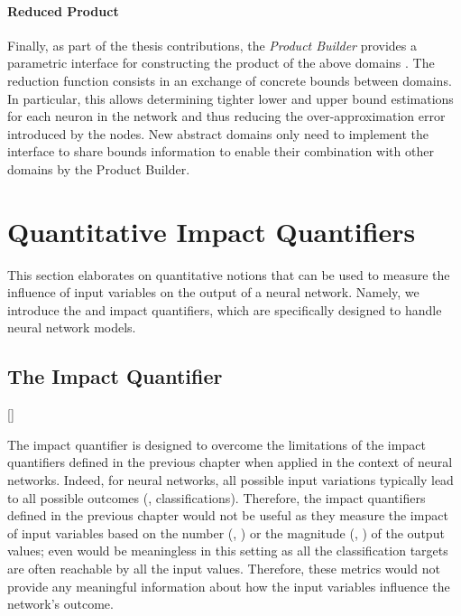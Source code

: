 \paragraph{Reduced Product}

Finally, as part of the thesis contributions, the \emph{Product Builder}  provides a parametric interface for constructing the product of the above domains .
The reduction function consists in an exchange of concrete bounds between domains. In particular, this allows determining tighter lower and upper bound estimations for each neuron in the network and thus reducing the over-approximation error introduced by the \relu{} nodes.
New abstract domains only need to implement the interface to share bounds information to enable their combination with other domains by the Product Builder.



\section{Quantitative Impact Quantifiers}

This section elaborates on quantitative notions that can be used to measure the influence of input variables on the output of a neural network.
Namely, we introduce the \changesname{} and \qlibraname{} impact quantifiers, which are specifically designed to handle neural network models.

\subsection{The \changesname{} Impact Quantifier}[\changesname]


The \changesname{} impact quantifier is designed to overcome the limitations of the impact quantifiers defined in the previous chapter when applied in the context of neural networks.
Indeed, for neural networks, all possible input variations typically lead to all possible outcomes (\ie, classifications).
Therefore, the impact quantifiers defined in the previous chapter would not be useful as they measure the impact of input variables based on the number (\eg, \outcomesname{}) or the magnitude (\eg, \rangename{}) of the output values; even \qusedname{} would be meaningless in this setting as all the classification targets are often reachable by all the input values.
Therefore, these metrics would not provide any meaningful information about how the input variables influence the network's outcome.

